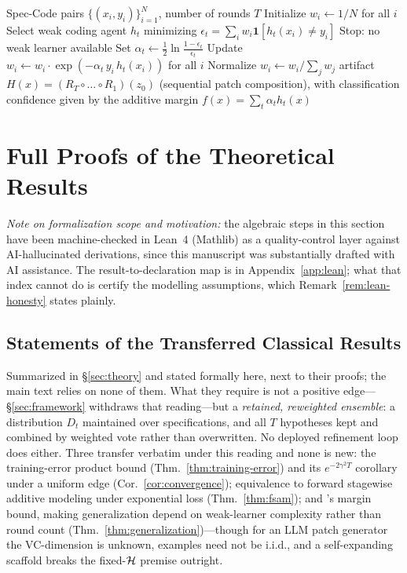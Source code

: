 \begin{algorithm}[h]
\caption{Agentic Boosting Protocol for Specifications}
\label{alg:boost}
\begin{algorithmic}[1]
\REQUIRE Spec-Code pairs $\{(x_i, y_i)\}_{i=1}^N$, number of rounds $T$
\STATE Initialize $w_i \leftarrow 1/N$ for all $i$
    \STATE Select weak coding agent $h_t$ minimizing $\epsilon_t = \sum_i w_i \mathbf{1}[h_t(x_i) \neq y_i]$
        \STATE Stop: no weak learner available
    \ENDIF
    \STATE Set $\alpha_t \leftarrow \frac{1}{2}\ln\frac{1 - \epsilon_t}{\epsilon_t}$
    \STATE Update $w_i \leftarrow w_i \cdot \exp(-\alpha_t \, y_i \, h_t(x_i))$ for all $i$
    \STATE Normalize $w_i \leftarrow w_i / \sum_j w_j$
\ENDFOR
\RETURN artifact $H(x) = (R_T \circ \dots \circ R_1)(z_0)$ (sequential patch composition), with classification confidence given by the additive margin $f(x) = \sum_t \alpha_t h_t(x)$
\end{algorithmic}
\end{algorithm}

\section{Full Proofs of the Theoretical Results}
\label{app:proofs}

\emph{Note on formalization scope and motivation:} the algebraic steps in this section have been machine-checked in Lean~4 (Mathlib) as a quality-control layer against AI-hallucinated derivations, since this manuscript was substantially drafted with AI assistance. The result-to-declaration map is in Appendix~\ref{app:lean}; what that index cannot do is certify the modelling assumptions, which Remark~\ref{rem:lean-honesty} states plainly.

\subsection{Statements of the Transferred Classical Results}
\label{app:classical-statements}

Summarized in \S\ref{sec:theory} and stated formally here, next to their proofs; the main text relies on none of them. What they require is not a positive edge---\S\ref{sec:framework} withdraws that reading---but a \emph{retained, reweighted ensemble}: a distribution $D_t$ maintained over specifications, and all $T$ hypotheses kept and combined by weighted vote rather than overwritten. No deployed refinement loop does either. Three transfer verbatim under this reading and none is new: the training-error product bound (Thm.~\ref{thm:training-error}) and its $e^{-2\gamma^2T}$ corollary under a uniform edge (Cor.~\ref{cor:convergence}); equivalence to forward stagewise additive modeling under exponential loss (Thm.~\ref{thm:fsam}); and \citet{schapire1998boosting}'s margin bound, making generalization depend on weak-learner complexity rather than round count (Thm.~\ref{thm:generalization})---though for an LLM patch generator the VC-dimension is unknown, examples need not be i.i.d., and a self-expanding scaffold breaks the fixed-$\mathcal{H}$ premise outright.

